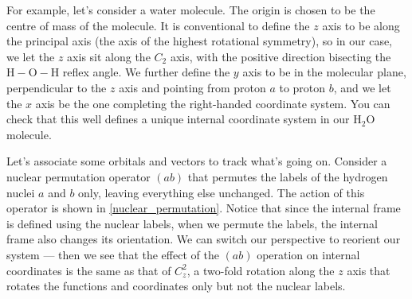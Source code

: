 \documentclass{article}
\theoremstyle{plain}\theoremheaderfont{\normalfont\itshape}\theorembodyfont{\rmfamily}\theoremseparator{.}\newtheorem*{rem}{Remark}\newtheorem*{ex}{Example}\newtheorem*{proof}{Proof}\newtheorem*{altp}{Alternative proof}
\theoremstyle{plain}\theoremheaderfont{\normalfont\bfseries}\theorembodyfont{\rmfamily}\theoremseparator{.}\newtheorem{thm}{Theorem}[section]\newtheorem{lem}[thm]{Lemma}\newtheorem{prop}[thm]{Proposition}\newtheorem*{cor}{Corollary}\newtheorem{defn}[thm]{Definition}\newtheorem{clm}[thm]{Claim}\newtheorem{clminproof}{Claim}\newtheorem*{law}{Law}\newtheorem{pos}[thm]{Postulate}
\theoremstyle{break}\theoremheaderfont{\normalfont\itshape}\theorembodyfont{\rmfamily}\theoremseparator{.\medskip}\newtheorem*{proofskip}{Proof}\newtheorem*{exs}{Examples}\newtheorem*{rems}{Remarks}
\theoremstyle{break}\theoremheaderfont{\normalfont\bfseries}\theorembodyfont{\rmfamily}\theoremseparator{.\medskip}\newtheorem{lemskip}[thm]{Lemma}\newtheorem{defnskip}[thm]{Definition}\newtheorem{propskip}[thm]{Proposition}\newtheorem{thmskip}[thm]{Theorem}
\numberwithin{equation}{section}
\begin{document}
    For example, let's consider a water molecule. The origin is chosen to be the centre of mass of the molecule. It is conventional to define the \(z\) axis to be along the principal axis (the axis of the highest rotational symmetry), so in our case, we let the \(z\) axis sit along the \(C_2\) axis, with the positive direction bisecting the \(\mathrm{H-O-H}\) reflex angle. We further define the \(y\) axis to be in the molecular plane, perpendicular to the \(z\) axis and pointing from proton \(a\) to proton \(b\), and we let the \(x\) axis be the one completing the right-handed coordinate system. You can check that this well defines a unique internal coordinate system in our \(\mathrm{H_2O}\) molecule.

    \begin{figure}[ht!]
        \centering
    \end{figure}

    Let's associate some orbitals and vectors to track what's going on. Consider a nuclear permutation operator \((ab)\) that permutes the labels of the hydrogen nuclei \(a\) and \(b\) only, leaving everything else unchanged. The action of this operator is shown in \cref{nuclear_permutation}. Notice that since the internal frame is defined using the nuclear labels, when we permute the labels, the internal frame also changes its orientation. We can switch our perspective to reorient our system --- then we see that the effect of the \((ab)\) operation on internal coordinates is the same as that of \(C_z^2\), a two-fold rotation along the \(z\) axis that rotates the functions and coordinates only but not the nuclear labels.
\end{document}
